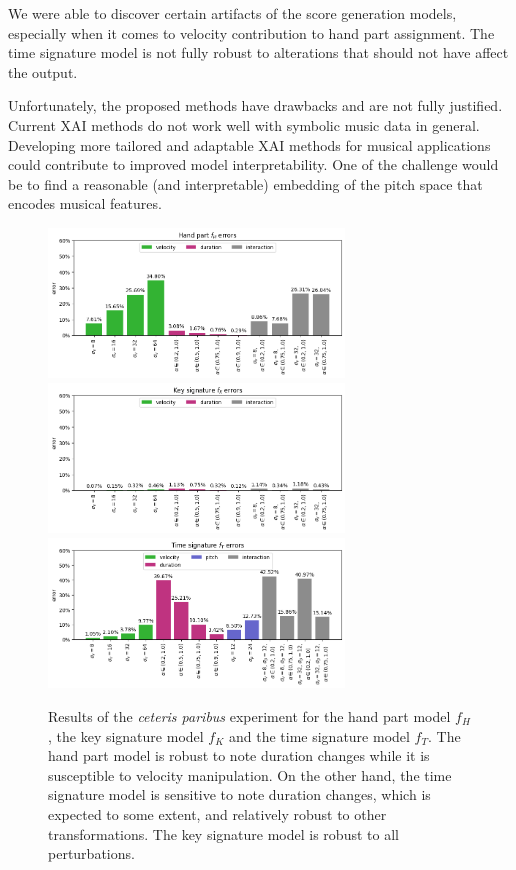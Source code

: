 We were able to discover certain artifacts of the score generation models, especially when it comes to velocity contribution to hand part assignment. The time signature model is not fully robust to alterations that should not have affect the output.

Unfortunately, the proposed methods have drawbacks and are not fully justified. Current XAI methods do not work well with symbolic music data in general. Developing more tailored and adaptable XAI methods for musical applications could contribute to improved model interpretability. One of the challenge would be to find a reasonable (and interpretable) embedding of the pitch space that encodes musical features. 

\begin{figure}[!ht]
\centering
\includegraphics[width=0.7\textwidth]{images/ceteris_paribus_results_h.png}
\includegraphics[width=0.7\textwidth]{images/ceteris_paribus_results_k.png}
\includegraphics[width=0.7\textwidth]{images/ceteris_paribus_results_t.png}
\caption[Results of the \emph{ceteris paribus} experiment]{Results of the \emph{ceteris paribus} experiment for the hand part model $f_H$, the key signature model $f_K$ and the time signature model $f_T$. The hand part model is robust to note duration changes while it is susceptible to velocity manipulation. On the other hand, the time signature model is sensitive to note duration changes, which is expected to some extent, and relatively robust to other transformations. The key signature model is robust to all perturbations.}
\label{ceteris_paribus}
\end{figure}

